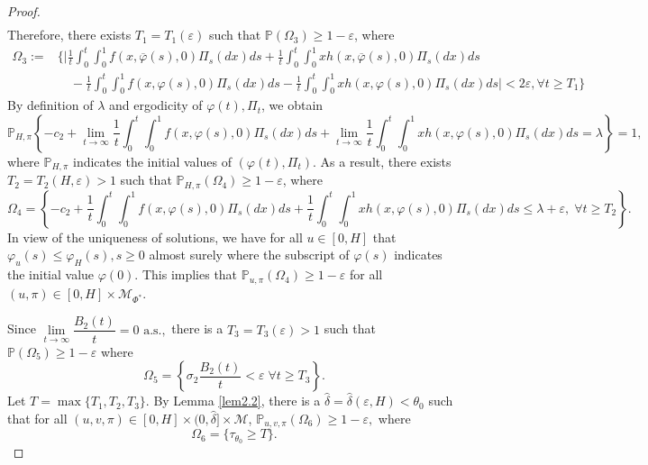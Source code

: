 \documentclass[12pt]{amsart}
\theoremstyle{remark}
\numberwithin{equation}{section}
\newcommand{\eps}{\varepsilon}
\newcommand{\M}{\mathcal{M}}
\newcommand{\PP}{\mathbb{P}}
\numberwithin{equation}{section}
\newcommand{\PPi}{\PP_{u,v,\pi}}
\newcommand{\1}{\boldsymbol{1}}
\def\bar{\overline}
\def\hat{\widehat}
\begin{document}
\begin{proof}
\begin{equation}
\begin{aligned}
\end{aligned}
\end{equation}
Therefore, there exists $T_1=T_1(\eps)$ such that
$\PP(\Omega_3)\geq 1-\eps$, where
$$
\begin{aligned}
\Omega_3:=&\Bigg\{\bigg|\frac 1t\int_0^t\int_0^1f(x,\bar\varphi(s),0)\Pi_s(dx)ds+\frac1t\int_0^t\int_0^1xh(x,\bar \varphi(s),0)\Pi_s(dx)ds\\
&\quad-\frac 1t\int_0^t\int_0^1f(x,\varphi(s),0)\Pi_s(dx)ds-
\frac1t\int_0^t\int_0^1xh(x, \varphi(s),0)\Pi_s(dx)ds\bigg| <2\eps,\forall t\geq T_1\Bigg\}
\end{aligned}
$$
By definition of $\lambda$ and ergodicity of $\varphi(t), \Pi_t$, we obtain
\begin{equation*}
\PP_{H,\pi}\left\{-c_2+ \lim_{t\to\infty}\dfrac1t\int_0^{t}\int_0^1f(x,\varphi(s),0)\Pi_s(dx)ds+\lim_{t\to\infty}\frac 1t\int_0^t \int_0^1xh(x,\varphi(s),0)\Pi_s(dx)ds= \lambda \right\}=1,
\end{equation*}
where $\PP_{H,\pi}$ indicates the initial values of $(\varphi(t),\Pi_t)$.
As a result, there exists $T_2=T_2(H,\eps)>1$ such that $\PP_{H,\pi}(\Omega_4)\geq 1-\eps$, where
$$\Omega_4=\left\{-c_2+\dfrac1t \int_0^t\int_0^1 f(x,\varphi(s),0)\Pi_s(dx)ds+\frac 1t\int_0^t \int_0^1xh(x,\varphi(s),0)\Pi_s(dx)ds\leq \lambda + \eps,\;\forall t\geq T_2\right\} .$$
In view of the uniqueness
of solutions, we have for all $u\in[0,H]$ that $\varphi_u(s)\leq \varphi_H(s), s \geq 0$ almost surely where the subscript of $\varphi(s)$ indicates the initial value $\varphi(0)$.
This implies that $\PP_{u,\pi}(\Omega_4)\geq 1-\eps$ for all $(u,\pi)\in[0,H]\times\M_{\Phi^*}$.

Since $\lim\limits_{t\to\infty}\dfrac{B_2(t)}{t}=0 \text{ a.s.},$ there is a $T_3=T_3(\eps)>1$ such that $\mathbb{P}(\Omega_5)\geq1-\eps$ where
$$\Omega_5=\left\{\sigma_2\dfrac{B_2(t)}{t}<\eps\;\forall t \geq T_3\right\}.$$
Let $T=\max\{T_1,T_2,T_3\}$. By Lemma \ref{lem2.2}, there is a $\hat\delta=\hat\delta(\eps,H)<\theta_0$ such that for all $(u,v,\pi)\in[0,H]\times (0,\hat\delta]\times\M$,
$
\PPi(\Omega_6)\geq 1-\eps,
$
where
$$
\Omega_6=\{\tau_{\theta_0}\geq T\}.
$$


\end{proof}
\end{document}
